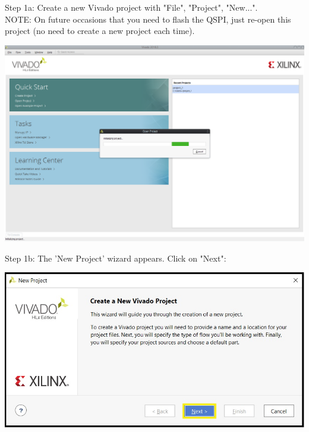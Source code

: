 \begin{minipage}{\linewidth}
  Step 1a: Create a new Vivado project with "File", "Project", "New...". \\
  NOTE: On future occasions that you need to flash the QSPI, just re-open this project (no need to create a new project each time).  \\
  \begin{center}
    \includegraphics[width=0.8\linewidth]{images/vivado01.png}
  \end{center}
\end{minipage}

\vspace{5mm}

\begin{minipage}{\linewidth}
  Step 1b: The 'New Project' wizard appears. Click on "Next": \\
  \begin{center}
    \includegraphics[width=0.8\linewidth]{images/vivado01b.png}
  \end{center}
\end{minipage}

